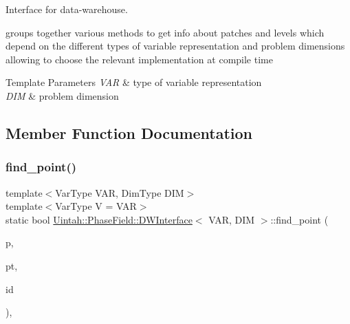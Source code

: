 Interface for data-\/warehouse. 

groups together various methods to get info about patches and levels which depend on the different types of variable representation and problem dimensions allowing to choose the relevant implementation at compile time


\begin{DoxyTemplParams}{Template Parameters}
{\em V\+AR} & type of variable representation \\
\hline
{\em D\+IM} & problem dimension \\
\hline
\end{DoxyTemplParams}


\subsection{Member Function Documentation}
\mbox{\label{structUintah_1_1PhaseField_1_1DWInterface_a0914b9ebb7d4aba921e212d5a47f55c9}} 
\subsubsection{\texorpdfstring{find\+\_\+point()}{find\_point()}}
{\footnotesize\ttfamily template$<$Var\+Type V\+AR, Dim\+Type D\+IM$>$ \\
template$<$Var\+Type V = V\+AR$>$ \\
static bool \hyperlink{structUintah_1_1PhaseField_1_1DWInterface}{Uintah\+::\+Phase\+Field\+::\+D\+W\+Interface}$<$ V\+AR, D\+IM $>$\+::find\+\_\+point (\begin{DoxyParamCaption}\item[{const Patch $\ast$}]{p,  }\item[{const Point \&}]{pt,  }\item[{Int\+Vector \&}]{id }\end{DoxyParamCaption})\hspace{0.3cm}{\ttfamily [inline]}, {\ttfamily [static]}}

\mbox{\label{structUintah_1_1PhaseField_1_1DWInterface_a963134e752d1511f7600c4cfb00350a6}} 
